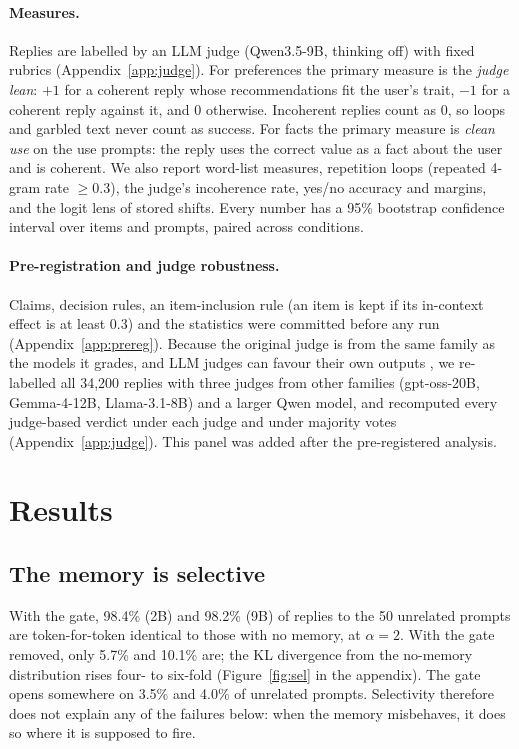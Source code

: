 \documentclass[11pt]{article}
\begin{document}
\paragraph{Measures.} Replies are labelled by an LLM judge \citep{zheng2023judging} (Qwen3.5-9B, thinking off) with fixed rubrics (Appendix~\ref{app:judge}). For preferences the primary measure is the \emph{judge lean}: $+1$ for a coherent reply whose recommendations fit the user's trait, $-1$ for a coherent reply against it, and $0$ otherwise. Incoherent replies count as 0, so loops and garbled text never count as success. For facts the primary measure is \emph{clean use} on the use prompts: the reply uses the correct value as a fact about the user and is coherent. We also report word-list measures, repetition loops (repeated 4-gram rate $\ge 0.3$), the judge's incoherence rate, yes/no accuracy and margins, and the logit lens \citep{nostalgebraist2020logitlens} of stored shifts. Every number has a 95\% bootstrap confidence interval over items and prompts, paired across conditions.

\paragraph{Pre-registration and judge robustness.} Claims, decision rules, an item-inclusion rule (an item is kept if its in-context effect is at least 0.3) and the statistics were committed before any run (Appendix~\ref{app:prereg}). Because the original judge is from the same family as the models it grades, and LLM judges can favour their own outputs \citep{zheng2023judging}, we re-labelled all 34{,}200 replies with three judges from other families (gpt-oss-20B, Gemma-4-12B, Llama-3.1-8B) and a larger Qwen model, and recomputed every judge-based verdict under each judge and under majority votes (Appendix~\ref{app:judge}). This panel was added after the pre-registered analysis.

\section{Results}
\label{sec:results}

\subsection{The memory is selective}
With the gate, 98.4\% (2B) and 98.2\% (9B) of replies to the 50 unrelated prompts are token-for-token identical to those with no memory, at $\alpha{=}2$. With the gate removed, only 5.7\% and 10.1\% are; the KL divergence from the no-memory distribution rises four- to six-fold (Figure~\ref{fig:sel} in the appendix). The gate opens somewhere on 3.5\% and 4.0\% of unrelated prompts. Selectivity therefore does not explain any of the failures below: when the memory misbehaves, it does so where it is supposed to fire.
\end{document}
